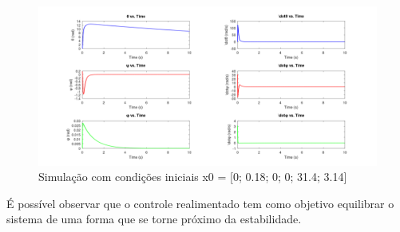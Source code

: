 \documentclass[10pt]{article}
\begin{document}
\begin{figure}[h]
    \centering
    \includegraphics[scale=0.17]{ode45_2_r.png}
    \caption{Simulação com condições iniciais x0 = [0; 0.18; 0; 0; 31.4; 3.14]}
\end{figure}

\quad É possível observar que o controle realimentado tem como objetivo equilibrar o sistema de uma forma que se torne próximo da estabilidade.

\newpage
\end{document}
